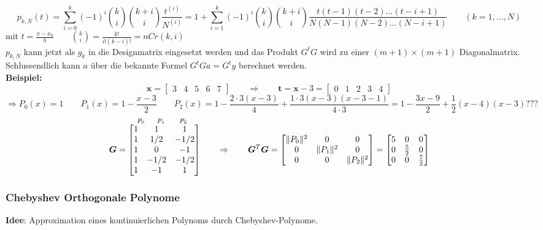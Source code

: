 $$\boxed{p_{k,N}(t) = \sum_{i=0}^k (-1)^i \binom{k}{i} \binom{k+i}{i} \frac{t^{(i)}}{N^{(i)}}= 
1+\sum_{i=1}^k (-1)^i \binom{k}{i} \binom{k+i}{i} \frac{t(t-1)(t-2)\ldots(t-i+1)}{N(N-1)(N-2)\ldots(N-i+1)} \qquad (k = 1,\ldots,N)}$$
mit $t=\frac{x-x_0}{h} \qquad \binom{k}{i}=\frac{k!}{i!(k-i)!}=nCr(k,i)$\\
$p_{k,N}$ kann jetzt als $g_{k}$ in die Designmatrix eingesetzt werden und das Produkt $G^t G$ wird 
zu einer $(m+1)\times(m+1)$ Diagonalmatrix. Schlussendlich kann $a$ über die bekannte Formel
$G^t G a = G^t y$ berechnet werden.\\

\textbf{Beispiel:}
$$\bm{x}=
	   \begin{bmatrix}
			3&4&5&6&7
	   \end{bmatrix}\qquad \Rightarrow\qquad \bm{t}=\bm{x}-3=
	   \begin{bmatrix}
	   		0&1&2&3&4
	   \end{bmatrix}$$
$$\Rightarrow P_0(x)=1 \qquad P_1(x)= 1-\frac{x-3}{2}\qquad P_2(x)=1-\frac{2\cdot 3 (x-3)}{4}+\frac{1 \cdot 3 (x-3)(x-3 -1)}{4 \cdot 3} = 1-\frac{3x-9}{2}+\frac 12 (x-4)(x-3)???$$
$$\overset{\hspace{0.6cm} P_0 \hspace{0.5cm} P_1 \hspace{0.6cm} P_2}{\bm{G} = \begin{bmatrix}
  1 & 1 	& 1\\
  1 & 1/2 	& -1/2\\
  1 & 0	  	& -1\\
  1 & -1/2 	& -1/2\\
  1 & -1 	& 1\\
\end{bmatrix}}\qquad \Rightarrow\qquad
\bm{G}^T\bm{G}=\begin{bmatrix}
 \| P_0\|^2 	& 0 	& 0\\
  0 		& \|P_1\|^2 	& 0\\
  0 		& 0	  	&\|P_2\|^2\\
\end{bmatrix}
= \begin{bmatrix}
  5 & 0 & 0 \\
  0 & \frac52 & 0\\
  0 & 0 & \frac{7} {2}\\
\end{bmatrix}
$$

\newpage
\subsubsection{Chebyshev Orthogonale Polynome}
\textbf{Idee}: Approximation eines kontinuierlichen Polynoms durch Chebyshev-Polynome.

